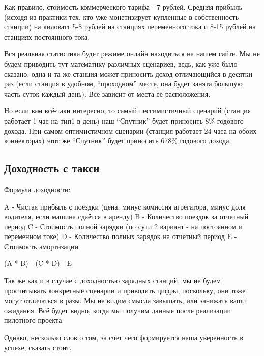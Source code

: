 \documentclass[a4paper,12pt]{report}
\begin{document}
Как правило, стоимость коммерческого тарифа - 7 рублей. Средняя прибыль (исходя из практики тех, кто уже монетизирует купленные в собственность станции) на киловатт 5-8 рублей на станциях переменного тока и 8-15 рублей на станциях постоянного тока. 

Вся реальная статистика будет режиме онлайн находиться на нашем сайте. Мы не будем приводить тут математику различных сценариев, ведь, как уже было сказано, одна и та же станция может приносить доход отличающийся в десятки раз (если станция в удобном, “проходном” месте, она будет занята большую часть суток каждый день). Всё зависит от места её расположения.

Но если вам всё-таки интересно, то самый пессимистичный сценарий (станция работает 1 час на тип1 в день) наш “Спутник” будет приносить 8\% годового дохода. При самом оптимистичном сценарии (станция работает 24 часа на обоих коннекторах) этот же “Спутник” будет приносить 678\% годового дохода.


\subsection{Доходность с такси}

Формула доходности:

A - Чистая прибыль с поездки (цена, минус комиссия агрегатора, минус доля водителя, если машина сдаётся в аренду)
B - Количество поездок за отчетный период
C - Стоимость полной зарядки (по сути 2 вариант - на постоянном и переменном токе)
D - Количество полных зарядок на отчетный период
E - Стоимость амортизации


(A * B) - (C * D) - E

Так же как и в случае с доходностью зарядных станций, мы не будем просчитывать конкретные сценарии и приводить цифры, поскольку, они тоже могут отличаться в разы. 
Мы не видим смысла завышать, или занижать ваши ожидания. Всё будет видно, когда мы получим данные после реализации пилотного проекта.

Однако, несколько слов о том, за счет чего формируется наша уверенность в успехе, сказать стоит. 
\end{document}

